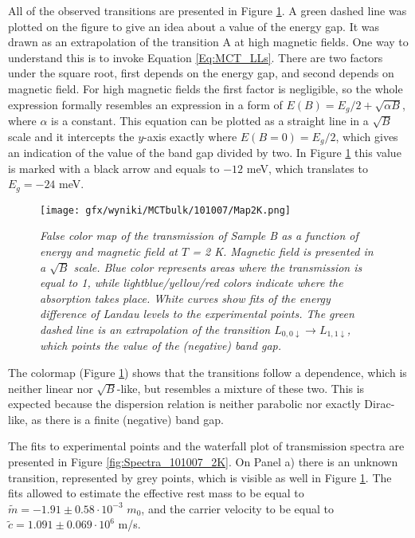 \documentclass[titlepage,a4paper]{book}
\begin{document}
All of the observed transitions are presented in Figure \ref{fig:Map_101007_2K}. A green dashed line was plotted on the figure to give an idea about a value of the energy gap. It was drawn as an extrapolation of the transition A at high magnetic fields. One way to understand this is to invoke Equation \ref{Eq:MCT_LLs}. There are two factors under the square root, first depends on the energy gap, and second depends on magnetic field. For high magnetic fields the first factor is negligible, so the whole expression formally resembles an expression in a form of $E(B) = E_g/2 + \sqrt{\alpha B} $, where $\alpha$ is a constant. This equation can be plotted as a straight line in a $\sqrt{B}$ scale and it intercepts the $y$-axis exactly where $E(B = 0) = E_g/2$, which gives an indication of the value of the band gap divided by two. In Figure \ref{fig:Map_101007_2K} this value is marked with a black arrow and equals to $-12$ meV, which translates to $E_g = -24$ meV.

\begin{figure}[H]
	\centering
	\texttt{[image: gfx/wyniki/MCTbulk/101007/Map2K.png]}
	\vspace{-10pt}
	\caption{\textit{False color map of the transmission of Sample B as a function of energy and magnetic field at $T$ = 2 K. Magnetic field is presented in a $\sqrt{B}$ scale. Blue color represents areas where the transmission is equal to 1, while lightblue/yellow/red colors indicate where the absorption takes place. White curves show fits of the energy difference of Landau levels to the experimental points. The green dashed line is an extrapolation of the transition $L_{0,0\downarrow}\rightarrow L_{1,1\downarrow}$, which points the value of the (negative) band gap.}}
	\label{fig:Map_101007_2K}
\end{figure} 

The colormap (Figure \ref{fig:Map_101007_2K}) shows that the transitions follow a dependence, which is neither linear nor  $\sqrt{B}$-like, but resembles a mixture of these two. This is expected because the dispersion relation is neither parabolic nor exactly Dirac-like, as there is a finite (negative) band gap. 

The fits to experimental points and the waterfall plot of transmission spectra are presented in Figure \ref{fig:Spectra_101007_2K}. On Panel a) there is an unknown transition, represented by grey points, which is visible as well in Figure \ref{fig:Map_101007_2K}. The fits allowed to estimate the effective rest mass to be equal to $\tilde m = -1.91 \pm 0.58 \cdot 10^{-3}$ $m_0$, and the carrier velocity to be equal to $\tilde{c} = 1.091 \pm 0.069 \cdot 10^6$ m/s. 
\end{document}
